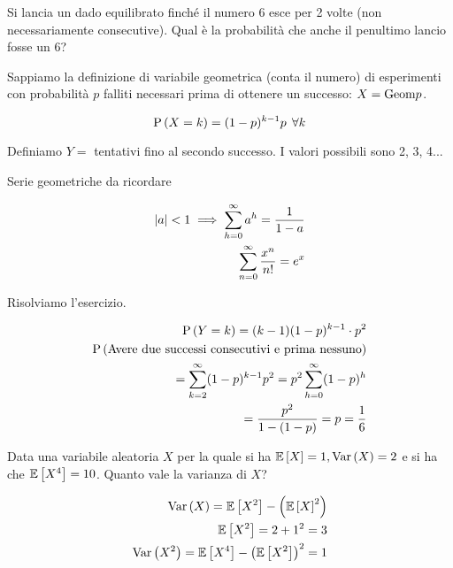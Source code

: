 \begin{exrc}
    Si lancia un dado equilibrato finch\'e il numero 6 esce per 2 volte
    (non necessariamente consecutive). Qual \`e la probabilit\`a che anche il
    penultimo lancio fosse un 6?

    Sappiamo la definizione di variabile geometrica (conta il numero)
    di esperimenti con probabilit\`a $ p $ falliti necessari prima di ottenere un
    successo: $ X = \text{Geom}{p} $.

    \begin{equation*}
        \text{P}\left(X = k\right) = (1-p)^{k-1}p \>\> \forall k
    \end{equation*}

    Definiamo $ Y = $ tentativi fino al secondo successo. I valori possibili sono 2, 3, 4...


    \begin{note}
        Serie geometriche da ricordare

        \begin{equation*}
            \begin{aligned}
                \lvert a\rvert < 1 \implies \sum_{h=0}^{\infty} a^h = \dfrac{1}{1-a} \\
                \sum_{n=0}^\infty \dfrac{x^n}{n!} = e^x
            \end{aligned}
        \end{equation*}
    \end{note}

    Risolviamo l'esercizio.

    \begin{equation*}
        \begin{aligned}
            \text{P}\left(Y = k\right) = (k-1)(1-p)^{k-1}\cdot p^2 \\
            \text{P}\left(\text{Avere due successi consecutivi e prima nessuno}\right) \\
            = \sum_{k=2}^\infty (1-p)^{k-1}p^2 =  p^2 \sum_{h=0}^{\infty} (1-p)^h \\
            = \dfrac{p^2}{1-(1-p)} = p = \dfrac{1}{6}
        \end{aligned}
    \end{equation*}
\end{exrc}


\begin{exrc}
    Data una variabile aleatoria $ X $ per la quale si ha $ \mathbb{E}\left[X\right] = 1, \text{Var}\left(X\right) = 2$ e si ha che $ \mathbb{E}\left[X^4\right] = 10 $. Quanto vale la varianza di $ X $?

    \begin{equation*}
        \begin{aligned}
            \text{Var}\left(X\right) = \mathbb{E}\left[X^2\right] - \left( \mathbb{E}\left[X\right]^2 \right) \\
            \mathbb{E}\left[X^2\right] = 2 + 1^2 = 3 \\
            \text{Var}\left(X^2\right) = \mathbb{E}\left[X^4\right] - \left( \mathbb{E}\left[X^2\right] \right)^2 = 1
        \end{aligned}
    \end{equation*}
\end{exrc}

